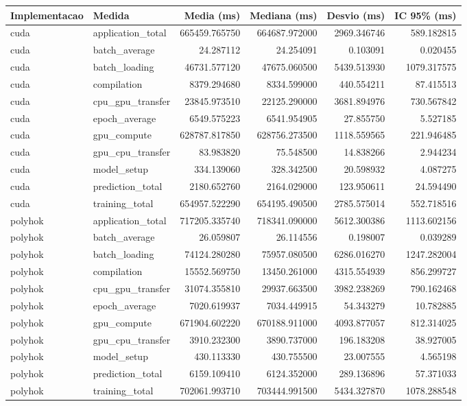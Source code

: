 \begin{tabular}{llrrrr}
\hline
Implementacao & Medida & Media (ms) & Mediana (ms) & Desvio (ms) & IC 95\% (ms) \\
\hline
cuda & application\_total & 665459.765750 & 664687.972000 & 2969.346746 & 589.182815 \\
cuda & batch\_average & 24.287112 & 24.254091 & 0.103091 & 0.020455 \\
cuda & batch\_loading & 46731.577120 & 47675.060500 & 5439.513930 & 1079.317575 \\
cuda & compilation & 8379.294680 & 8334.599000 & 440.554211 & 87.415513 \\
cuda & cpu\_gpu\_transfer & 23845.973510 & 22125.290000 & 3681.894976 & 730.567842 \\
cuda & epoch\_average & 6549.575223 & 6541.954905 & 27.855750 & 5.527185 \\
cuda & gpu\_compute & 628787.817850 & 628756.273500 & 1118.559565 & 221.946485 \\
cuda & gpu\_cpu\_transfer & 83.983820 & 75.548500 & 14.838266 & 2.944234 \\
cuda & model\_setup & 334.139060 & 328.342500 & 20.598932 & 4.087275 \\
cuda & prediction\_total & 2180.652760 & 2164.029000 & 123.950611 & 24.594490 \\
cuda & training\_total & 654957.522290 & 654195.490500 & 2785.575014 & 552.718516 \\
polyhok & application\_total & 717205.335740 & 718341.090000 & 5612.300386 & 1113.602156 \\
polyhok & batch\_average & 26.059807 & 26.114556 & 0.198007 & 0.039289 \\
polyhok & batch\_loading & 74124.280280 & 75957.080500 & 6286.016270 & 1247.282004 \\
polyhok & compilation & 15552.569750 & 13450.261000 & 4315.554939 & 856.299727 \\
polyhok & cpu\_gpu\_transfer & 31074.355810 & 29937.663500 & 3982.238269 & 790.162468 \\
polyhok & epoch\_average & 7020.619937 & 7034.449915 & 54.343279 & 10.782885 \\
polyhok & gpu\_compute & 671904.602220 & 670188.911000 & 4093.877057 & 812.314025 \\
polyhok & gpu\_cpu\_transfer & 3910.232300 & 3890.737000 & 196.183208 & 38.927005 \\
polyhok & model\_setup & 430.113330 & 430.755500 & 23.007555 & 4.565198 \\
polyhok & prediction\_total & 6159.109410 & 6124.352000 & 289.136896 & 57.371033 \\
polyhok & training\_total & 702061.993710 & 703444.991500 & 5434.327870 & 1078.288548 \\
\hline
\end{tabular}
